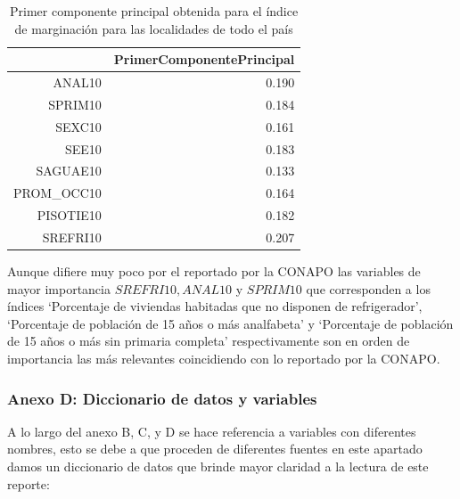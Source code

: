 \documentclass[paper=letter, fontsize=11pt]{scrartcl}
\numberwithin{equation}{section} %
\numberwithin{figure}{section} %
\numberwithin{table}{section} %
\begin{document}
\begin{enumerate}
\begin{enumerate}
\begin{table}[ht]
\centering
\begin{tabular}{rr}
  \hline
     &      PrimerComponentePrincipal \\
     \hline
ANAL10 &                         0.190\\
SPRIM10 &                        0.184\\
SEXC10  &                       0.161\\
SEE10    &                      0.183\\
SAGUAE10  &                     0.133\\
PROM\_OCC10 &                    0.164\\
PISOTIE10   &                   0.182\\
SREFRI10     &                  0.207\\
\hline
\end{tabular}
\caption{Primer componente principal obtenida para el índice de marginación para las localidades de todo el país}
\end{table}
Aunque difiere muy poco por el reportado por la CONAPO las variables de mayor importancia $SREFRI10,ANAL10$ y $SPRIM10$ que corresponden a los índices ‘Porcentaje de viviendas habitadas que no disponen de refrigerador’, ‘Porcentaje de población de 15 años o más analfabeta’ y ‘Porcentaje de población de 15 años o más sin primaria completa’ respectivamente son en orden de importancia las más relevantes coincidiendo con lo reportado por la CONAPO.

\subsubsection{Anexo D: Diccionario de datos y variables}
A lo largo del anexo B, C, y D se hace referencia a variables con diferentes nombres, esto se debe a que proceden de diferentes fuentes en este apartado damos un diccionario de datos que brinde mayor claridad a la lectura de este reporte:\\


\end{enumerate}
\end{enumerate}
\end{document}
